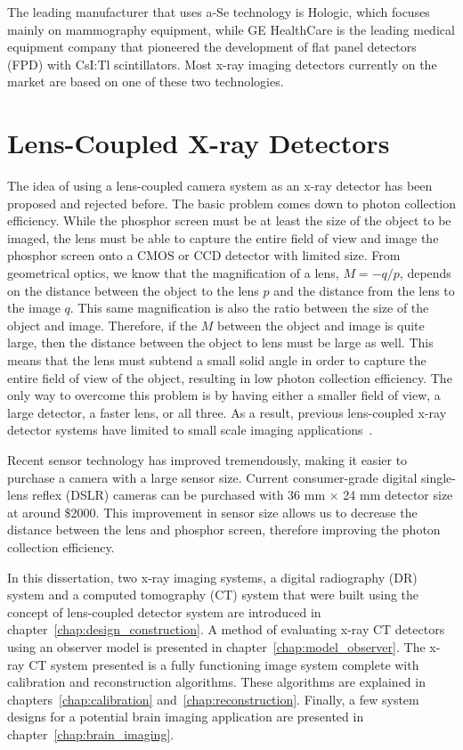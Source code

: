 The leading manufacturer that uses a-Se technology is Hologic, which focuses mainly on mammography equipment, while GE HealthCare is the leading medical equipment company that pioneered the development of flat panel detectors (FPD) with CsI:Tl scintillators.  Most x-ray imaging detectors currently on the market are based on one of these two technologies.  

\section{Lens-Coupled X-ray Detectors}
The idea of using a lens-coupled camera system as an x-ray detector has been proposed and rejected before.  The basic problem comes down to photon collection efficiency.  While the phosphor screen must be at least the size of the object to be imaged, the lens must be able to capture the entire field of view and image the phosphor screen onto a CMOS or CCD detector with limited size.  From geometrical optics, we know that the magnification of a lens, $M = -q/p$, depends on the distance between the object to the lens $p$ and the distance from the lens to the image $q$. This same magnification is also the ratio between the size of the object and image.  Therefore, if the $M$ between the object and image is quite large, then the distance between the object to lens must be large as well.  This means that the lens must subtend a small solid angle in order to capture the entire field of view of the object, resulting in low photon collection efficiency.  The only way to overcome this problem is by having either a smaller field of view, a large detector, a faster lens, or all three.  As a result, previous lens-coupled x-ray detector systems have limited to small scale imaging applications~\citep{lee2001, kim2005, tate2005, madden2006}.  

Recent sensor technology has improved tremendously, making it easier to purchase a camera with a large sensor size.  Current consumer-grade digital single-lens reflex (DSLR) cameras can be purchased with 36 mm $\times$ 24 mm detector size at around \$2000.  This improvement in sensor size allows us to decrease the distance between the lens and phosphor screen, therefore improving the photon collection efficiency.

In this dissertation, two x-ray imaging systems, a digital radiography (DR) system and a computed tomography (CT) system that were built using the concept of lens-coupled detector system are introduced in chapter~\ref{chap:design_construction}.  A method of evaluating x-ray CT detectors using an observer model is presented in chapter~\ref{chap:model_observer}.   The x-ray CT system presented is a fully functioning image system complete with calibration and reconstruction algorithms.  These algorithms are explained in chapters~\ref{chap:calibration} and~\ref{chap:reconstruction}.  Finally, a few system designs for a potential brain imaging application are presented in chapter~\ref{chap:brain_imaging}.  
